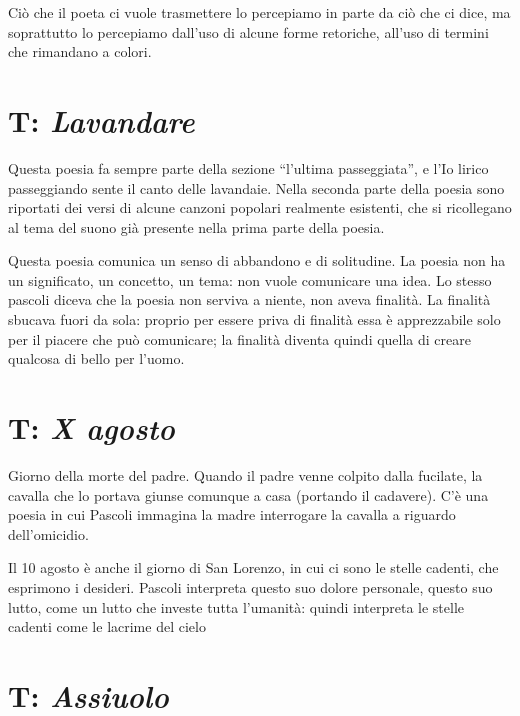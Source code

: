 Ciò che il poeta ci vuole trasmettere lo percepiamo in parte da ciò che ci dice, ma soprattutto lo percepiamo dall’uso di alcune forme retoriche, all’uso di termini che rimandano a colori.


\section{T: \textit{Lavandare}}

Questa poesia fa sempre parte della sezione “l’ultima passeggiata”, e l’Io lirico passeggiando sente il canto delle lavandaie.
Nella seconda parte della poesia sono riportati dei versi di alcune canzoni popolari realmente esistenti, che si ricollegano al tema del suono già presente nella prima parte della poesia.

Questa poesia comunica un senso di abbandono e di solitudine. La poesia non ha un significato, un concetto, un tema: non vuole comunicare una idea.
Lo stesso pascoli diceva che la poesia non serviva a niente, non aveva finalità. La finalità sbucava fuori da sola: proprio per essere priva di finalità essa è apprezzabile solo per il piacere che può comunicare; la finalità diventa quindi quella di creare qualcosa di bello per l’uomo.



\section{T: \textit{X agosto}}

Giorno della morte del padre.
Quando il padre venne colpito dalla fucilate, la cavalla che lo portava giunse comunque a casa (portando il cadavere).
C’è una poesia in cui Pascoli immagina la madre interrogare la cavalla a riguardo dell’omicidio.

Il 10 agosto è anche il giorno di San Lorenzo, in cui ci sono le stelle cadenti, che esprimono i desideri.
Pascoli interpreta questo suo dolore personale, questo suo lutto, come un lutto che investe tutta l’umanità: quindi interpreta le stelle cadenti come le lacrime del cielo


\section{T: \textit{Assiuolo}}

